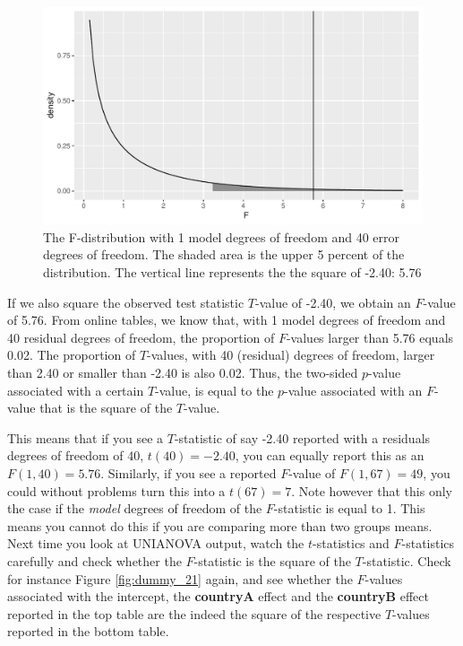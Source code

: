\documentclass[]{report}\usepackage[]{graphicx}\usepackage[]{color}
\makeatletter
\def\maxwidth{ %
  \ifdim\Gin@nat@width>\linewidth
    \linewidth
  \else
    \Gin@nat@width
  \fi
}
\newenvironment{knitrout}{}{} %
\makeatother
\begin{document}
\begin{knitrout}
\color{fgcolor}\begin{figure}

{\centering \includegraphics[width=\maxwidth]{figure/dummy_25-1} 

}

\caption[The F-distribution with 1 model degrees of freedom and 40 error degrees of freedom]{The F-distribution with 1 model degrees of freedom and 40 error degrees of freedom. The shaded area is the upper 5 percent of the distribution. The vertical line represents the the square of -2.40: 5.76}\label{fig:dummy_25}
\end{figure}


\end{knitrout}


If we also square the observed test statistic $T$-value of -2.40, we obtain an $F$-value of 5.76. From online tables, we know that, with 1 model degrees of freedom and 40 residual degrees of freedom, the proportion of $F$-values larger than 5.76 equals 0.02. The proportion of $T$-values, with 40 (residual) degrees of freedom, larger than 2.40 or smaller than -2.40 is also 0.02. Thus, the two-sided $p$-value associated with a certain $T$-value, is equal to the $p$-value associated with an $F$-value that is the square of the $T$-value. 

This means that if you see a $T$-statistic of say -2.40 reported with a residuals degrees of freedom of 40, $t(40)=-2.40$, you can equally report this as an $F(1,40)=5.76$. Similarly, if you see a reported $F$-value of $F(1,67)=49$, you could without problems turn this into a $t(67)=7$. Note however that this only the case if the \textit{model} degrees of freedom of the $F$-statistic is equal to 1. This means you cannot do this if you are comparing more than two groups means. Next time you look at UNIANOVA output, watch the $t$-statistics and $F$-statistics carefully and check whether the $F$-statistic is the square of the $T$-statistic. Check for instance Figure \ref{fig:dummy_21} again, and see whether the $F$-values associated with the intercept, the \textbf{countryA} effect and the \textbf{countryB} effect reported in the top table are the indeed the square of the respective $T$-values reported in the bottom table. 
\end{document}
